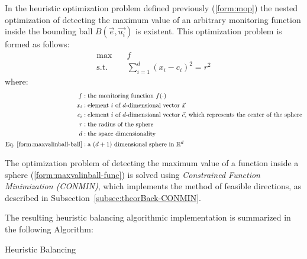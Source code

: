 In the heuristic optimization problem defined previously (\ref{form:mop}) the nested optimization of detecting the maximum value of an arbitrary monitoring function inside the bounding ball $B(\vec{e},\vec{u_i})$ is existent. This optimization problem is formed as follows:
\begin{align}
\max &\quad f \label{form:maxvalinball-func}\\
	\text{s.t.}&\quad \sum_{i=1}^d(x_i-c_i)^2=r^2 \label{form:maxvalinball-ball}
\end{align}
where:
\begin{align*}
f&: \text{the monitoring function $f(\cdot)$}\\
x_i&: \text{element $i$ of $d$-dimensional vector $\vec{x}$}\\
c_i&: \text{element $i$ of $d$-dimensional vector $\vec{c}$, which represents the center of the sphere}\\
r&: \text{the radius of the sphere}\\
d&: \text{the space dimensionality}\\
\text{Eq.~\ref{form:maxvalinball-ball}}&:\text{a $(d+1)$ dimensional sphere in $\mathbb{R}^d$}
\end{align*}

The optimization problem of detecting the maximum value of a function inside a sphere (\ref{form:maxvalinball-func}) is solved using \emph{Constrained Function Minimization (CONMIN)}, which implements the method of feasible directions, as described in Subsection~\ref{subsec:theorBack-CONMIN}.

The resulting heuristic balancing algorithmic implementation is summarized in the following Algorithm:\\
\begin{algorithm}[H]
\SetAlgoLined
{}


\caption{Heuristic Balancing \label{algo:heuristicbalancing}} 
\end{algorithm}

